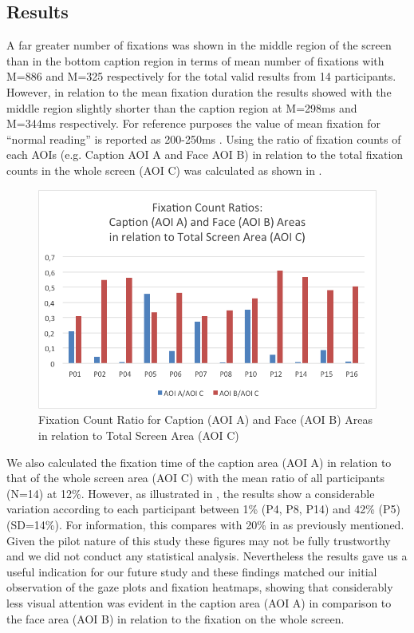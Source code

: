 \documentclass[output=paper]{langsci/langscibook}
\begin{document}
\subsection{Results}

A far greater number of fixations was shown in the middle region of the screen than in the bottom caption region in terms of mean number of fixations with M=886 and M=325 respectively for the total valid results from 14 participants. However, in relation to the mean fixation duration the results showed with the middle region slightly shorter than the caption region at M=298ms and M=344ms respectively. For reference purposes the value of mean fixation for ``normal reading'' is reported as 200-250ms \citep{Bruycker2007}. Using the ratio of fixation counts of each AOIs (e.g. Caption AOI A and Face AOI B) in relation to the total fixation counts in the whole screen (AOI C) was calculated as shown in . 

\begin{figure}
 \includegraphics[width=\textwidth]{figures/OHagan4.png}
\caption{Fixation Count Ratio for Caption (AOI A) and Face (AOI B) Areas in relation to Total Screen Area (AOI C) }
\label{ohagan:fig:4}
\end{figure}

\largerpage[-1] 
We also calculated the fixation time of the caption area (AOI A) in relation to that of the whole screen area (AOI C) with the mean ratio of all participants (N=14) at 12\%.  However, as illustrated in , the results show a considerable variation according to each participant between 1\% (P4, P8, P14) and 42\% (P5) (SD=14\%).  For information, this compares with 20\% in \citet{dydewalle1991} as previously mentioned. Given the pilot nature of this study these figures may not be fully trustworthy and we did not conduct any statistical analysis. Nevertheless the results gave us a useful indication for our future study and these findings matched our initial observation of the gaze plots and fixation heatmaps, showing that considerably less visual attention was evident in the caption area (AOI A) in comparison to the face area (AOI B) in relation to the fixation on the whole screen.  
\end{document}
